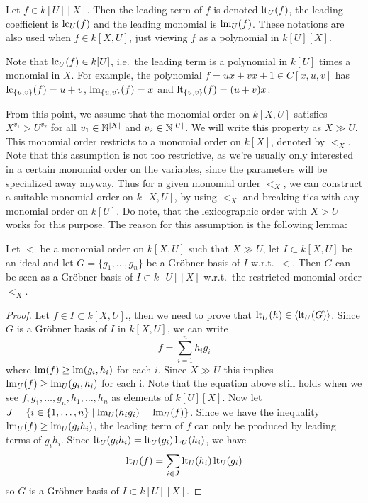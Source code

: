 \begin{definition}
  Let $f \in k[U][X]$. Then the leading term of $f$ is denoted $\operatorname{lt}_{U}(f)$, the leading coefficient is $\operatorname{lc}_{U}(f)$ and the leading monomial is $\operatorname{lm}_{U}(f)$. These notations are also used when $f \in k[X, U]$, just viewing $f$ as a polynomial in $k[U][X]$.
\end{definition}

Note that $\operatorname{lc}_{U}(f) \in k[U]$, i.e.\ the leading term is a polynomial in $k[U]$ times a monomial in $X$. For example, the polynomial $f = ux + vx + 1 \in C[x, u, v]$ has $\operatorname{lc}_{\{u, v\}}(f) = u + v$, $\operatorname{lm}_{\{u, v\}}(f) = x$ and $\operatorname{lt}_{\{u, v\}}(f) = (u+v)x$.

From this point, we assume that the monomial order on $k[X, U]$ satisfies $X^{v_{1}} > U^{v_{2}}$ for all $v_{1} \in \mathbb{N}^{|X|}$ and $v_{2} \in \mathbb{N}^{|U|}$. We will write this property as $X \gg U$. This monomial order restricts to a monomial order on $k[X]$, denoted by $<_{X}$. Note that this assumption is not too restrictive, as we're usually only interested in a certain monomial order on the variables, since the parameters will be specialized away anyway. Thus for a given monomial order $<_{X}$, we can construct a suitable monomial order on $k[X, U]$, by using $<_{X}$ and breaking ties with any monomial order on $k[U]$. Do note, that the lexicographic order with $X > U$ works for this purpose. The reason for this assumption is the following lemma:

\begin{lemma}\label{lem:block_order}
  Let $<$ be a monomial order on $k[X, U]$ such that $X \gg U$, let $I \subset k[X, U]$ be an ideal and let $G = \{g_{1}, \dots, g_{n}\}$ be a Gröbner basis of $I$ w.r.t.\ $<$. Then $G$ can be seen as a Gröbner basis of $I \subset k[U][X]$ w.r.t.\ the restricted monomial order $<_{X}$.
\end{lemma}
\begin{proof}
  Let $f \in I \subset k[X, U]$., then we need to prove that $\operatorname{lt}_{U}(h) \in \langle \operatorname{lt}_{U}(G) \rangle$. Since $G$ is a Gröbner basis of $I$ in $k[X, U]$, we can write
  \[ f = \sum_{i=1}^{n} h_{i} g_{i} \]
  where $\operatorname{lm}(f) \geq \operatorname{lm}(g_{i}, h_{i})$ for each $i$. Since $X \gg U$ this implies $\operatorname{lm}_{U}(f) \geq \operatorname{lm}_{U}(g_{i}, h_{i})$ for each i. Note that the equation above still holds when we see $f, g_{1}, \dots, g_{n}, h_{1}, \dots, h_{n}$ as elements of $k[U][X]$. Now let $J = \{i \in \{1, \dots, n\} \mid \operatorname{lm}_{U}(h_{i} g_{i}) = \operatorname{lm}_{U}(f)\}$. Since we have the inequality $\operatorname{lm}_{U}(f) \geq \operatorname{lm}_{U}(g_{i} h_{i})$, the leading term of $f$ can only be produced by leading terms of $g_{i}h_{i}$. Since $\operatorname{lt}_{U}(g_{i} h_{i}) = \operatorname{lt}_{U}(g_{i})\operatorname{lt}_{U}(h_{i})$, we have
  \[\operatorname{lt}_{U}(f) = \sum_{i \in J} \operatorname{lt}_{U}(h_{i}) \operatorname{lt}_{U}(g_{i})\]
  so $G$ is a Gröbner basis of $I \subset k[U][X]$.
\end{proof}











